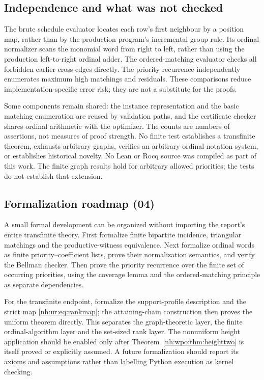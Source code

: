 \documentclass[11pt,a4paper]{article}
\theoremstyle{definition}
\theoremstyle{remark}
\begin{document}
\subsection{Independence and what was not checked}
The brute schedule evaluator locates each row's first neighbour by a position
map, rather than by the production program's incremental group rule. Its
ordinal normalizer scans the monomial word from right to left, rather than
using the production left-to-right ordinal adder. The ordered-matching
evaluator checks all forbidden earlier cross-edges directly. The priority
recurrence independently enumerates maximum high matchings and residuals.
These comparisons reduce implementation-specific error risk; they are not a
substitute for the proofs.

Some components remain shared: the instance representation and the basic
matching enumeration are reused by validation paths, and the certificate
checker shares ordinal arithmetic with the optimizer. The counts are numbers
of assertions, not measures of proof strength. No finite test establishes a
transfinite theorem, exhausts arbitrary graphs, verifies an arbitrary ordinal
notation system, or establishes historical novelty. No Lean or Rocq source was
compiled as part of this work. The finite graph results hold for arbitrary
allowed priorities; the tests do not establish that extension.

\subsection{Formalization roadmap (04)}
A small formal development can be organized without importing the report's
entire transfinite theory. First formalize finite bipartite incidence,
triangular matchings and the productive-witness equivalence. Next formalize
ordinal words as finite priority--coefficient lists, prove their
normalization semantics, and verify the Bellman checker. Then prove the
priority recurrence over the finite set of occurring priorities, using the
coverage lemma and the ordered-matching principle as separate dependencies.

For the transfinite endpoint, formalize the support-profile description and
the strict map \eqref{nh:ur:eq:rankmap}; the attaining-chain construction then
proves the uniform theorem directly. This separates the graph-theoretic layer,
the finite ordinal-algorithm layer and the set-sized rank layer. The
nonuniform height application should be enabled only after
Theorem~\ref{nh:wpo:thm:heighttwo} is itself proved or explicitly assumed. A
future formalization should report its axioms and assumptions rather than
labelling Python execution as kernel checking.
\end{document}
